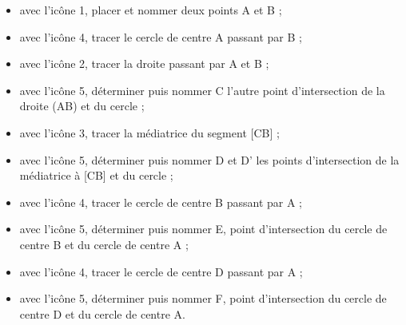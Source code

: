    \begin{itemize}
      \item avec l'icône 1, placer et nommer deux points A et B ;
      \item avec l'icône 4, tracer le cercle de centre A passant par B ;
      \item avec l'icône 2, tracer la droite passant par A et B ;
      \item avec l'icône 5, déterminer puis nommer C l'autre point d'intersection de la droite (AB) et du cercle ;
      \item avec l'icône 3, tracer la médiatrice du segment [CB] ;
      \item avec l'icône 5, déterminer puis nommer D et D' les points d'intersection de la médiatrice à [CB] et du cercle ;
      \item avec l'icône 4, tracer le cercle de centre B passant par A ;
      \item avec l'icône 5, déterminer puis nommer E, point d'intersection du cercle de centre B et du cercle de centre A ;
      \item avec l'icône 4, tracer le cercle de centre D passant par A ;
      \item avec l'icône 5, déterminer puis nommer F, point d'intersection du cercle de centre D et du cercle de centre A.
  \end{itemize}
